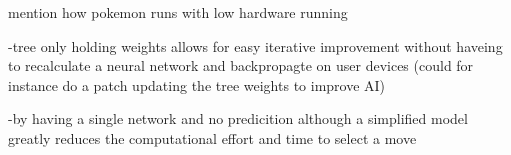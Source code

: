 mention how pokemon runs with low hardware running

-tree only holding weights allows for easy iterative improvement without haveing to recalculate 
a neural network and backpropagte on user devices (could for instance do a patch updating the
tree weights to improve AI)

-by having a single network and no predicition although a simplified model greatly reduces the computational
effort and time to select a move

